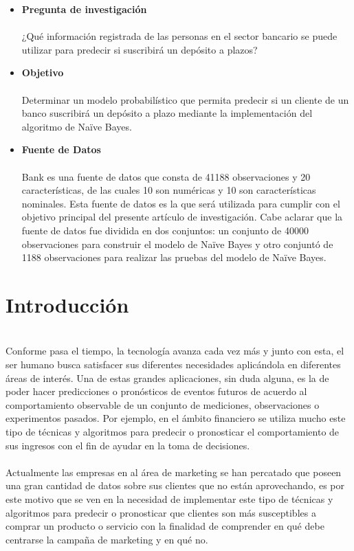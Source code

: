 \documentclass[letterpaper, 10 pt, conference]{ieeeconf}
\begin{document}
\begin{itemize}[leftmargin=*]
    \item \textbf{Pregunta de investigación}
    \\ \\¿Qué información registrada de las personas en el sector bancario se puede utilizar para predecir si suscribirá un depósito a plazos?\\
    
    \item \textbf{Objetivo}
    \\ \\ Determinar un modelo probabilístico que permita predecir si un cliente de un banco suscribirá un depósito a plazo mediante la implementación del algoritmo de Naïve Bayes.\\
    
    \item \textbf{Fuente de Datos}
    \\ \\ Bank \cite{dataset:2019} es una fuente de datos que consta de 41188 observaciones y 20 características, de las cuales 10 son numéricas y 10 son características nominales. Esta fuente de datos es la que será utilizada para cumplir con el objetivo principal del presente artículo de investigación. Cabe aclarar que la fuente de datos fue dividida en dos conjuntos: un conjunto de 40000 observaciones para construir el modelo de Naïve Bayes y otro conjuntó de 1188 observaciones para realizar las pruebas del modelo de Naïve Bayes.\\
\end{itemize}

\section{Introducción}

\\Conforme pasa el tiempo, la tecnología avanza cada vez más y junto con esta, el ser humano busca satisfacer sus diferentes necesidades aplicándola en diferentes áreas de interés. Una de estas grandes aplicaciones, sin duda alguna, es la de poder hacer predicciones o pronósticos de eventos futuros de acuerdo al comportamiento observable de un conjunto de mediciones, observaciones o experimentos pasados. Por ejemplo, en el ámbito financiero se utiliza mucho este tipo de técnicas y algoritmos para predecir o pronosticar el comportamiento de sus ingresos con el fin de ayudar en la toma de decisiones.\\\\ Actualmente las empresas en al área de marketing se han percatado que poseen una gran cantidad de datos sobre sus clientes que no están aprovechando, es por este motivo que se ven en la necesidad de implementar este tipo de técnicas y algoritmos para predecir o pronosticar que clientes son más susceptibles a comprar un producto o servicio con la finalidad de comprender en qué debe centrarse la campaña de marketing y en qué no.
\end{document}
